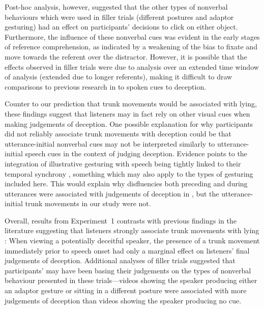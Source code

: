 \documentclass[a4paper,man,natbib]{apa6}
\begin{document}
Post-hoc analysis, however, suggested that the other types of nonverbal behaviours which were used in filler trials (different postures and adaptor gesturing) had an effect on participants' decisions to click on either object. 
Furthermore, the influence of these nonverbal cues was evident in the early stages of reference comprehension, as indicated by a weakening of the bias to fixate and move towards the referent over the distractor. 
However, it is possible that the effects observed in filler trials were due to analysis over an extended time window of analysis (extended due to longer referents), making it difficult to draw comparisons to previous research in to spoken cues to deception. 

Counter to our prediction that trunk movements would be associated with lying, these findings suggest that listeners may in fact rely on other visual cues when making judgements of deception.
One possible explanation for why participants did not reliably associate trunk movements with deception could be that utterance-initial nonverbal cues may not be interpreted similarly to utterance-initial speech cues in the context of judging deception.
Evidence points to the integration of illustrative gesturing with speech being tightly linked to their temporal synchrony \citep[See][]{Habets2011}, something which may also apply to the types of gesturing included here.
This would explain why disfluencies both preceding and during utterances were associated with judgements of deception in \citet{Loy2017}, but the utterance-initial trunk movements in our study were not.

Overall, results from Experiment~1 contrasts with previous findings in the literature suggesting that listeners strongly associate trunk movements with lying \citep[e.g.][]{Vrij1996a, Zuckerman1981}: When viewing a potentially deceitful speaker, the presence of a trunk movement immediately prior to speech onset had only a marginal effect on listeners' final judgements of deception.
Additional analyses of filler trials suggested that participants' may have been basing their judgements on the types of nonverbal behaviour presented in these trials---videos showing the speaker producing either an adaptor gesture or sitting in a different posture were associated with more judgements of deception than videos showing the speaker producing no cue.
\end{document}
